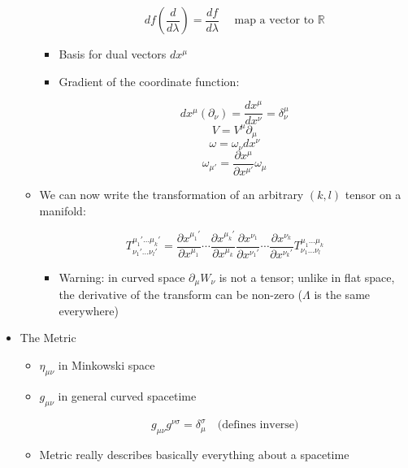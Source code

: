 \begin{itemize}
\begin{itemize}
\begin{itemize}
            $$df\left( \frac{d}{d\lambda} \right)=\frac{df}{d\lambda}\quad\text{ map a vector to $\mathbb{R}$}$$

          \item Basis for dual vectors $dx^{\mu}$

          \item Gradient of the coordinate function:

            $$dx^{\mu}(\partial_{\nu})=\frac{dx^{\mu}}{dx^{\nu}}=\delta^{\mu}_{\nu}$$
            $$V=V^{\mu}\partial_{\mu}$$
            $$\omega=\omega_{\nu}dx^{\nu}$$
            $$\omega_{\mu\prime}=\frac{\partial x^{\mu}}{\partial x^{\mu\prime}}\omega_{\mu}$$

        \end{itemize}

      \item We can now write the transformation of an arbitrary $(k,l)$ tensor on a manifold:

        $$T^{\mu_1\prime\ldots\mu_{k}\prime}_{\nu_1\prime\ldots\nu_l\prime}=\frac{\partial x^{\mu_1\prime}}{\partial x^{\mu_1}}\cdots\frac{\partial x^{\mu_k\prime}}{\partial x^{\mu_k}}\frac{\partial x^{\nu_1}}{\partial x^{\nu_1\prime}}\cdots\frac{\partial x^{\nu_k}}{\partial x^{\nu_k\prime}}T^{\mu_1\ldots\mu_k}_{\nu_1\ldots\nu_l}$$

        \begin{itemize}

          \item Warning: in curved space $\partial_{\mu}W_{\nu}$ is not a tensor; unlike in flat space, the derivative of the transform can be non-zero ($\Lambda$ is the same everywhere)

        \end{itemize}

    \end{itemize}

  \item The Metric

    \begin{itemize}

      \item $\eta_{\mu\nu}$ in Minkowski space

      \item $g_{\mu\nu}$ in general curved spacetime

        $$g_{\mu\nu}g^{\nu\sigma}=\delta_{\mu}^{\sigma}\quad\text{(defines inverse)}$$

      \item Metric really describes basically everything about a spacetime


\end{itemize}
\end{itemize}
